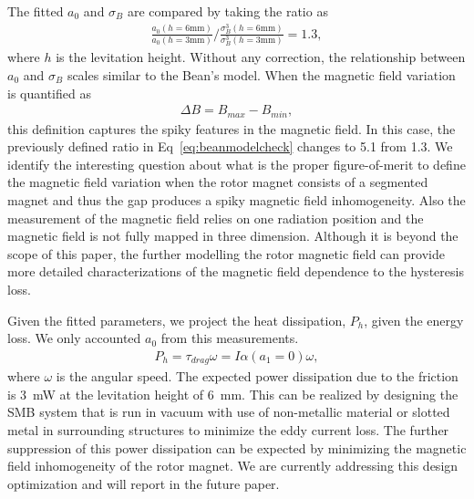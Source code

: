 \documentclass[journal]{IEEEtran}
\begin{document}
The fitted $a_0$ and $\sigma_B$ are compared by taking the ratio as
\begin{eqnarray}
\frac{a_0(h=6\mbox{mm})}{a_0(h=3\mbox{mm})} / \frac{\sigma^3_B(h=6\mbox{mm})}{\sigma^3_B(h=3\mbox{mm})} = 1.3,
\label{eq:beanmodelcheck}
\end{eqnarray}
where $h$ is the levitation height.
Without any correction, the relationship between $a_0$ and $\sigma_B$ scales similar to the Bean's model.
When the magnetic field variation is quantified as
\begin{eqnarray}
\Delta B = B_{max} - B_{min},
\label{eq:bmax-bmin}
\end{eqnarray}
this definition captures the spiky features in the magnetic field.
In this case, the previously defined ratio in Eq~\ref{eq:beanmodelcheck} changes to 5.1 from 1.3.
We identify the interesting question about what is the proper figure-of-merit to define the magnetic field variation when the rotor magnet consists of a segmented magnet and thus the gap produces a spiky magnetic field inhomogeneity.
Also the measurement of the magnetic field relies on one radiation position and the magnetic field is not fully mapped in three dimension.
Although it is beyond the scope of this paper, the further modelling the rotor magnetic field can provide more detailed characterizations of the magnetic field dependence to the hysteresis loss.

Given the fitted parameters, we project the heat dissipation, $P_{h}$, given the energy loss.
We only accounted $a_0$ from this measurements.
\begin{eqnarray}
P_{h} = \tau_{drag} \omega = I \alpha(a_1=0) \omega,
\label{eq:energyloss}
\end{eqnarray}
where $\omega$ is the angular speed.
The expected power dissipation due to the friction is 3~mW at the levitation height of 6~mm.
This can be realized by designing the SMB system that is run in vacuum with use of non-metallic material or slotted metal in surrounding structures to minimize the eddy current loss.
The further suppression of this power dissipation can be expected by minimizing the magnetic field inhomogeneity of the rotor magnet.
We are currently addressing this design optimization and will report in the future paper.
\end{document}
